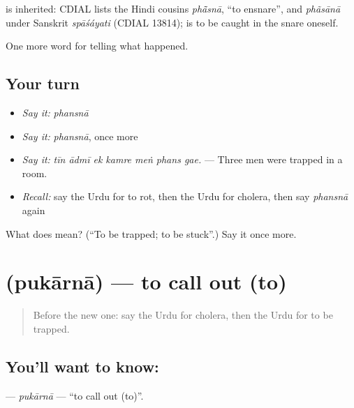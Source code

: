 \begin{cousinweb}
is inherited: CDIAL lists the Hindi cousins \emph{phā̃snā}, \textquotedblleft{}to ensnare\textquotedblright{}, and \emph{phãsānā} under Sanskrit \emph{spāśáyati} (CDIAL 13814); \textbf{} is to be caught in the snare oneself.
\end{cousinweb}

\begin{grammarlens}[title={What you've built}]
One more word for telling what happened.
\end{grammarlens}

\subsection*{Your turn}
\begin{itemize}
\raggedright
  \item \emph{Say it:} \emph{phansnā}
  \item \emph{Say it:} \emph{phansnā}, once more
  \item \emph{Say it:} \emph{tīn ādmī ek kamre meṅ phans gae.} — Three men were trapped in a room.
  \item \emph{Recall:} say the Urdu for to rot, then the Urdu for cholera, then say \emph{phansnā} again
\end{itemize}

\begin{tcolorbox}[breakable,colback=teal!4,colframe=teal!35!black,title={Before you move on}]
What does  mean? (\textquotedblleft{}To be trapped; to be stuck\textquotedblright{}.) Say it once more.
\end{tcolorbox}
\section[\texorpdfstring{\ur{پکارنا} (pukārnā)}{پکارنا (pukārnā)}]{ (pukārnā) — to call out (to)}

\label{lesson:UR-C295-pukarna}



\begin{quote}
Before the new one: say the Urdu for cholera, then the Urdu for to be trapped.
\end{quote}

\subsection*{You'll want to know: }
\textbf{} — \emph{pukārnā} — \textquotedblleft{}to call out (to)\textquotedblright{}.

